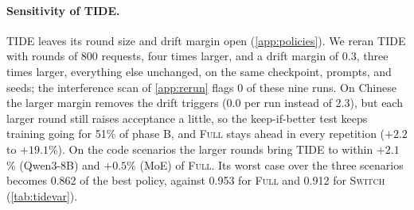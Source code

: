\documentclass{article}
\newcommand{\pol}[1]{\textsc{#1}}
\begin{document}
\paragraph{Sensitivity of \pol{TIDE}.}\label{app:tidevar} TIDE leaves its round size and drift margin open (\cref{app:policies}). We reran \pol{TIDE} with rounds of 800 requests, four times larger, and a drift margin of 0.3, three times larger, everything else unchanged, on the same checkpoint, prompts, and seeds; the interference scan of \cref{app:rerun} flags 0 of these nine runs. On Chinese the larger margin removes the drift triggers (0.0 per run instead of 2.3), but each larger round still raises acceptance a little, so the keep-if-better test keeps training going for 51\% of phase B, and \pol{Full} stays ahead in every repetition ($+2.2$ to $+19.1$\%). On the code scenarios the larger rounds bring \pol{TIDE} to within $+2.1$\% (Qwen3-8B) and $+0.5$\% (MoE) of \pol{Full}. Its worst case over the three scenarios becomes 0.862 of the best policy, against 0.953 for \pol{Full} and 0.912 for \pol{Switch} (\cref{tab:tidevar}).
\end{document}
